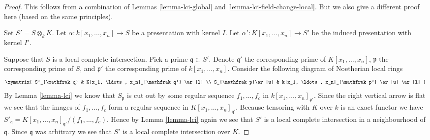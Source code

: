 \begin{proof}
This follows from a combination of Lemmas
\ref{lemma-lci-global} and \ref{lemma-lci-field-change-local}.
But we also give a different
proof here (based on the same principles).

\medskip\noindent
Set $S' = S \otimes_k K$. Let $\alpha : k[x_1, \ldots, x_n] \to S$ be a
presentation with kernel $I$. Let $\alpha' : K[x_1, \ldots, x_n] \to S'$
be the induced presentation with kernel $I'$.

\medskip\noindent
Suppose that $S$ is a local complete intersection.
Pick a prime $\mathfrak q \subset S'$. Denote
$\mathfrak q'$ the corresponding prime of $K[x_1, \ldots, x_n]$,
$\mathfrak p$ the corresponding prime of $S$, and
$\mathfrak p'$ the corresponding prime of $k[x_1, \ldots, x_n]$.
Consider the following diagram of Noetherian local rings
$$
\xymatrix{
S'_{\mathfrak q} &  K[x_1, \ldots, x_n]_{\mathfrak q'} \ar[l] \\
S_{\mathfrak p}\ar[u] &  k[x_1, \ldots, x_n]_{\mathfrak p'} \ar[u] \ar[l]
}
$$
By Lemma \ref{lemma-lci} we know that $S_{\mathfrak p}$
is cut out by some regular sequence $f_1, \ldots, f_c$ in
$k[x_1, \ldots, x_n]_{\mathfrak p'}$. Since the right vertical
arrow is flat we see that the images of $f_1, \ldots, f_c$
form a regular sequence in $K[x_1, \ldots, x_n]_{\mathfrak q'}$.
Because tensoring with $K$ over $k$ is an exact functor we have
$S'_{\mathfrak q} = K[x_1, \ldots, x_n]_{\mathfrak q'}/(f_1, \ldots, f_c)$.
Hence by Lemma \ref{lemma-lci} again we see that $S'$ is a local
complete intersection in a neighbourhood of $\mathfrak q$. Since
$\mathfrak q$ was arbitrary we see that $S'$ is a local complete
intersection over $K$.


\end{proof}
